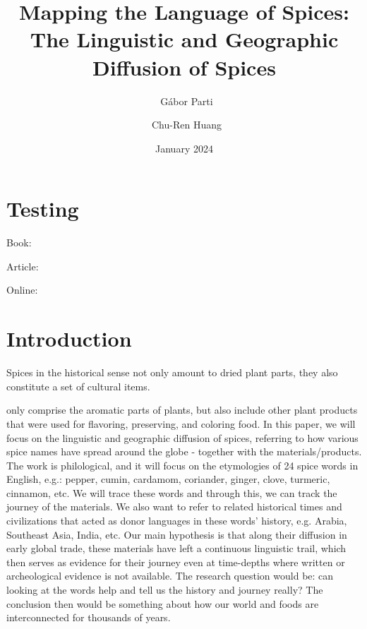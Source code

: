\documentclass{dsh} %
\title{Mapping the Language of Spices: The Linguistic and Geographic Diffusion of Spices}
\author[1]{{\small\orcid{0000-0003-2042-4655}}~Gábor Parti}
\author[2]{{\small\orcid{0000-0002-8526-5520}}~Chu-Ren Huang}
\affil[1,2]{The Hong Kong Polytechnic University}
\date{\small{January 2024}}
\begin{document}
\maketitle

\begin{abstract}
\end{abstract}


\section{Testing}

Book: \textcite{dalby_2000_dangerous}

Article: \textcite{dalby_2001_christopher}

Online: \textcite{oed}

\textcite{powo}




\section{Introduction}

Spices in the historical sense not only amount to dried plant parts, they also constitute a set of cultural items. 

only comprise the aromatic parts of plants, but also include other plant products that were used for flavoring, preserving, and coloring food. In this paper, we will focus on the linguistic and geographic diffusion of spices, referring to how various spice names have spread around the globe - together with the materials/products. The work is philological, and it will focus on the etymologies of 24 spice words in English, e.g.: pepper, cumin, cardamom, coriander, ginger, clove, turmeric, cinnamon, etc. We will trace these words and through this, we can track the journey of the materials. We also want to refer to related historical times and civilizations that acted as donor languages in these words' history, e.g. Arabia, Southeast Asia, India, etc. Our main hypothesis is that along their diffusion in early global trade, these materials have left a continuous linguistic trail, which then serves as evidence for their journey even at time-depths where written or archeological evidence is not available. The research question would be: can looking at the words help and tell us the history and journey really? The conclusion then would be something about how our world and foods are interconnected for thousands of years.
\end{document}

